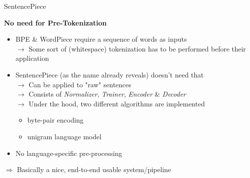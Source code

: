 \begin{frame}{SentencePiece \href{https://www.aclweb.org/anthology/D18-2012.pdf}{}}

\vfill

	\textbf{No need for Pre-Tokenization}

	\begin{itemize}
		\item BPE \& WordPiece require a sequence of words as inputs\\
					$\rightarrow$ Some sort of (whitespace) tokenization has to be performed before their application
		\item SentencePiece (as the name already reveals) doesn't need that\\
					$\rightarrow$ Can be applied to "raw" sentences\\
					$\rightarrow$ Consists of \textit{Normalizer}, \textit{Trainer}, \textit{Encoder} \& \textit{Decoder}\\
					$\rightarrow$ Under the hood, two different algorithms are implemented
					\begin{itemize}
						\item byte-pair encoding \href{https://www.aclweb.org/anthology/P16-1162.pdf}{}
						\item unigram language model \href{https://www.aclweb.org/anthology/P18-1007.pdf}{}
					\end{itemize}
		\item No language-specific pre-processing
	\end{itemize}
	
	\vspace{.3cm}
	
	$\Rightarrow$ Basically a nice, end-to-end usable system/pipeline

\vfill

\end{frame}


